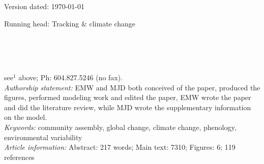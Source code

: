 \documentclass[11pt,letterpaper]{article}
\begin{document}
\begin{flushright}
Version dated: \today
\end{flushright}
\bigskip
\noindent Running head: Tracking \& climate change
\bigskip
\medskip
\begin{center}
\\
\bigskip
{}\\
\\
\medskip
\end{center}
 see$^{1}$ above; Ph: 604.827.5246 (no fax).\\

\noindent \emph{Authorship statement:} EMW and MJD both conceived of the paper, produced the figures, performed modeling work and edited the paper, EMW wrote the paper and did the literature review, while MJD wrote the supplementary information on the model.  \\
\noindent \emph{Keywords:} community assembly, global change, climate change, phenology, environmental variability\\
\noindent \emph{Article information:} Abstract: 217 words; Main text: 7310; Figures: 6; 119 references

\end{document}
